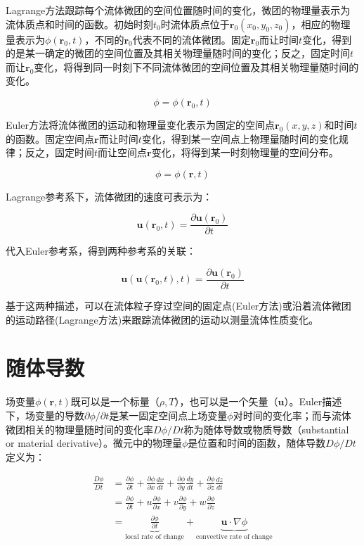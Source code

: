 Lagrange方法跟踪每个流体微团的空间位置随时间的变化，微团的物理量表示为流体质点和时间的函数。初始时刻$ t_0 $时流体质点位于$ \bm{r}_0(x_0, y_0, z_0) $，相应的物理量表示为$ \phi(\bm{r}_0, t) $，不同的$ \bm{r}_0 $代表不同的流体微团。固定$ \bm{r}_0 $而让时间$ t $变化，得到的是某一确定的微团的空间位置及其相关物理量随时间的变化；反之，固定时间$ 
t $而让$ \bm{r}_0 $变化，将得到同一时刻下不同流体微团的空间位置及其相关物理量随时间的变化。

\begin{equation}
\phi = \phi(\bm{r}_0, t)
\end{equation}

Euler方法将流体微团的运动和物理量变化表示为固定的空间点$ \bm{r}_0(x, y, z) $和时间$ t $的函数。固定空间点$ \bm{r} $而让时间$ t $变化，得到某一空间点上物理量随时间的变化规律；反之，固定时间$ t $而让空间点$ \bm{r} $变化，将得到某一时刻物理量的空间分布。

\begin{equation}
\phi = \phi(\bm{r}, t)
\end{equation}

Lagrange参考系下，流体微团的速度可表示为：

\[ \bm{u}(\bm{r}_0, t) = \frac{\partial \bm{u}(\bm{r}_0)}{\partial t} \]

代入Euler参考系，得到两种参考系的关联：

\begin{equation}
\bm{u}(\bm{u}(\bm{r}_0, t), t) = \frac{\partial \bm{u}(\bm{r}_0)}{\partial t}
\end{equation}

基于这两种描述，可以在流体粒子穿过空间的固定点(Euler方法)或沿着流体微团的运动路径(Lagrange方法)来跟踪流体微团的运动以测量流体性质变化。

\section{随体导数}

场变量$ \phi(\bm{r}, t) $既可以是一个标量（$ \rho, T $），也可以是一个矢量（$ \bm{u} $）。Euler描述下，场变量的导数$ \partial\phi/\partial t $是某一固定空间点上场变量$ \phi $对时间的变化率；而与流体微团相关的物理量随时间的变化率$ D\phi/Dt $称为随体导数或物质导数（substantial or material derivative）。微元中的物理量$ \phi $是位置和时间的函数，随体导数$ D\phi/Dt $定义为：

\begin{align}
\frac{D\phi}{Dt} & = \frac{\partial \phi}{\partial t}+\frac{\partial \phi}{\partial x}\frac{dx}{dt} + \frac{\partial \phi}{\partial y}\frac{dy}{dt} + \frac{\partial \phi}{\partial z}\frac{dz}{dt} \\
& =\frac{\partial \phi}{\partial t}+u\frac{\partial \phi}{\partial x}+v\frac{\partial \phi}{\partial y}+w\frac{\partial \phi}{\partial z} \\
& = \underbrace{\frac{\partial \phi}{\partial t}}_{\text{local rate
    of change}}+\underbrace{\bm{u}\cdot \nabla \phi}_{\text{convective rate
    of change}}
\end{align}

